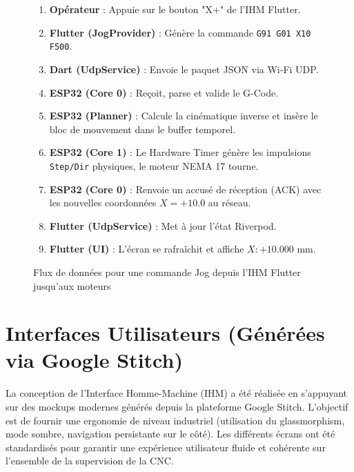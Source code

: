 \begin{figure}[htbp]
    \centering
    \begin{tcolorbox}[colback=white, colframe=macouleur, title=Séquence de transmission (Jog)]
    \begin{enumerate}
        \item \textbf{Opérateur} : Appuie sur le bouton "X+" de l'IHM Flutter.
        \item \textbf{Flutter (JogProvider)} : Génère la commande \texttt{G91 G01 X10 F500}.
        \item \textbf{Dart (UdpService)} : Envoie le paquet JSON via Wi-Fi UDP.
        \item \textbf{ESP32 (Core 0)} : Reçoit, parse et valide le G-Code.
        \item \textbf{ESP32 (Planner)} : Calcule la cinématique inverse et insère le bloc de mouvement dans le buffer temporel.
        \item \textbf{ESP32 (Core 1)} : Le Hardware Timer génère les impulsions \texttt{Step/Dir} physiques, le moteur NEMA 17 tourne.
        \item \textbf{ESP32 (Core 0)} : Renvoie un accusé de réception (ACK) avec les nouvelles coordonnées $X=+10.0$ au réseau.
        \item \textbf{Flutter (UdpService)} : Met à jour l'état Riverpod.
        \item \textbf{Flutter (UI)} : L'écran se rafraîchit et affiche $X: +10.000$ mm.
    \end{enumerate}
    \end{tcolorbox}
    \caption{Flux de données pour une commande Jog depuis l'IHM Flutter jusqu'aux moteurs}
    \label{fig:seq_jog}
\end{figure}

\section{Interfaces Utilisateurs (Générées via Google Stitch)}

La conception de l'Interface Homme-Machine (IHM) a été réalisée en s'appuyant sur des mockups modernes générés depuis la plateforme Google Stitch. L'objectif est de fournir une ergonomie de niveau industriel (utilisation du glassmorphism, mode sombre, navigation persistante sur le côté). Les différents écrans ont été standardisés pour garantir une expérience utilisateur fluide et cohérente sur l'ensemble de la supervision de la CNC.

